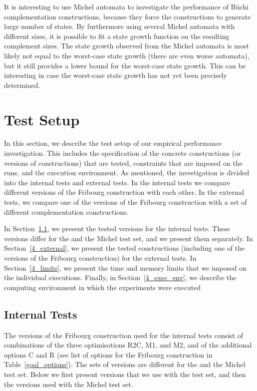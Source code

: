 It is interesting to use Michel automata to investigate the performance of Büchi complementation constructions, because they force the constructions to generate large number of states. By furthermore using several Michel automata with different sizes, it is possible to fit a state growth function on the resulting complement sizes. The state growth observed from the Michel automata is most likely not equal to the worst-case state growth (there are even worse automata), but it still provides a lower bound for the worst-case state growth. This can be interesting in case the worst-case state growth has not yet been precisely determined.


\section{Test Setup}
\label{4_exp_setup}
In this section, we describe the test setup of our empirical performance investigation. This includes the specification of the concrete constructions (or versions of constructions) that are tested, constraints that are imposed on the runs, and the execution environment. As mentioned, the investigation is divided into the internal tests and external tests. In the internal tests we compare different versions of the Fribourg construction with each other. In the external tests, we compare one of the versions of the Fribourg construction with a set of different complementation constructions.

In Section~\ref{4_internal}, we present the tested versions for the internal tests. These versions differ for the \goal{} and the Michel test set, and we present them separately. In Section~\ref{4_external}, we present the tested constructions (including one of the versions of the Fribourg construction) for the external tests. In Section~\ref{4_limits}, we present the time and memory limits that we imposed on the individual executions. Finally, in Section~\ref{4_exec_env}, we describe the computing environment in which the experiments were executed

\subsection{Internal Tests}
\label{4_internal}
The versions of the Fribourg construction used for the internal tests consist of combinations of the three optimisations R2C, M1, and M2, and of the additional options C and R (see list of options for the Fribourg construction in Table~\ref{goal_options}). The sets of versions are different for the \goal{} and the Michel test set. Below we first present versions that we use with the \goal{} test set, and then the versions used with the Michel test set.


